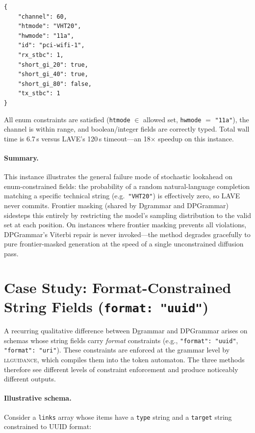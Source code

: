 \begin{lstlisting}[style=appendixcode]
{
    "channel": 60,
    "htmode": "VHT20",
    "hwmode": "11a",
    "id": "pci-wifi-1",
    "rx_stbc": 1,
    "short_gi_20": true,
    "short_gi_40": true,
    "short_gi_80": false,
    "tx_stbc": 1
}
\end{lstlisting}

All enum constraints are satisfied (\texttt{htmode} $\in$ allowed set, \texttt{hwmode} $=$ \texttt{"11a"}), the channel is within range, and boolean/integer fields are correctly typed.
Total wall time is 6.7\,s versus LAVE's 120\,s timeout—an 18$\times$ speedup on this instance.

\paragraph{Summary.}
This instance illustrates the general failure mode of stochastic lookahead on enum-constrained fields: the probability of a random natural-language completion matching a specific technical string (e.g.\ \texttt{"VHT20"}) is effectively zero, so LAVE never commits.
Frontier masking (shared by Dgrammar and DPGrammar) sidesteps this entirely by restricting the model's sampling distribution to the valid set at each position.
On instances where frontier masking prevents all violations, DPGrammar's Viterbi repair is never invoked—the method degrades gracefully to pure frontier-masked generation at the speed of a single unconstrained diffusion pass.

\section{Case Study: Format-Constrained String Fields (\texttt{format: "uuid"})}
\label{app:format}

A recurring qualitative difference between Dgrammar and DPGrammar arises on schemas whose string fields carry \emph{format} constraints (e.g., \texttt{"format": "uuid"}, \texttt{"format": "uri"}).
These constraints are enforced at the grammar level by \textsc{llguidance}, which compiles them into the token automaton.
The three methods therefore see different levels of constraint enforcement and produce noticeably different outputs.

\paragraph{Illustrative schema.}
Consider a \texttt{links} array whose items have a \texttt{type} string and a \texttt{target} string constrained to UUID format:


